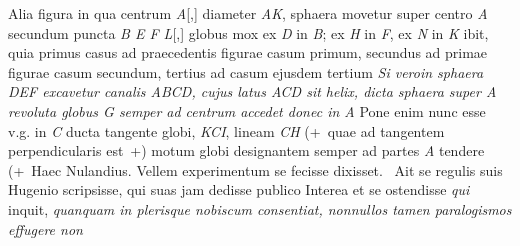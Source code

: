 \pend 
\vspace{2em}
\pstart
Alia figura
in qua centrum \textit{A}[,] diameter \textit{AK}, sphaera\protect{}
movetur super centro \textit{A} secundum puncta \textit{B E F L}[,]
globus mox ex \textit{D} in \textit{B}; ex \textit{H} in \textit{F}, ex \textit{N} in \textit{K} ibit,
quia primus casus ad praecedentis figurae casum primum,
secundus ad primae figurae casum secundum,
tertius ad casum ejusdem tertium
%
\textit{Si veroin sphaera \textit{DEF} excavetur canalis \textit{ABCD},
cujus latus \textit{ACD} sit helix,
dicta sphaera super \textit{A} revoluta globus \textit{G} semper ad centrum accedet
donec in \textit{A}
}
%
Pone enim nunc esse v.g. in \textit{C} ducta tangente globi, \textit{KCI}, lineam \textit{CH}
(+~quae ad tangentem perpendicularis est~+)
motum globi designantem semper ad partes \textit{A} tendere
%
(+~Haec Nulandius.\protect{}
Vellem experimentum\protect{} se fecisse dixisset.~%
%
Ait se 
regulis suis Hugenio\protect{}
scripsisse, qui suas jam dedisse publico
Interea et se ostendisse
%
\textit{qui} inquit,
\textit{quanquam in plerisque nobiscum consentiat,
nonnullos tamen paralogismos\protect{} effugere non
}

